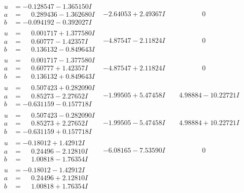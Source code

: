 \documentclass[1p]{elsarticle_modified}
\theoremstyle{definition}
\begin{document}
$$\begin{array}{c|c|c}
\begin{aligned}
u &= -0.128547 - 1.365150 I \\
a &= \phantom{-}0.289436 - 1.362680 I \\
b &= -0.094192 - 0.392027 I\end{aligned}
 & -2.64053 + 2.49367 I & \phantom{-0.000000 } 0 \\ \hline\begin{aligned}
u &= \phantom{-}0.001717 + 1.377580 I \\
a &= \phantom{-}0.60777 - 1.42357 I \\
b &= \phantom{-}0.136132 - 0.849643 I\end{aligned}
 & -4.87547 - 2.11824 I & \phantom{-0.000000 } 0 \\ \hline\begin{aligned}
u &= \phantom{-}0.001717 - 1.377580 I \\
a &= \phantom{-}0.60777 + 1.42357 I \\
b &= \phantom{-}0.136132 + 0.849643 I\end{aligned}
 & -4.87547 + 2.11824 I & \phantom{-0.000000 } 0 \\ \hline\begin{aligned}
u &= \phantom{-}0.507423 + 0.282090 I \\
a &= \phantom{-}0.85273 - 2.27652 I \\
b &= -0.631159 - 0.157718 I\end{aligned}
 & -1.99505 + 5.47458 I & \phantom{-}4.98884 - 10.22721 I \\ \hline\begin{aligned}
u &= \phantom{-}0.507423 - 0.282090 I \\
a &= \phantom{-}0.85273 + 2.27652 I \\
b &= -0.631159 + 0.157718 I\end{aligned}
 & -1.99505 - 5.47458 I & \phantom{-}4.98884 + 10.22721 I \\ \hline\begin{aligned}
u &= -0.18012 + 1.42912 I \\
a &= \phantom{-}0.24496 - 2.12810 I \\
b &= \phantom{-}1.00818 - 1.76354 I\end{aligned}
 & -6.08165 - 7.53590 I & \phantom{-0.000000 } 0 \\ \hline\begin{aligned}
u &= -0.18012 - 1.42912 I \\
a &= \phantom{-}0.24496 + 2.12810 I \\
b &= \phantom{-}1.00818 + 1.76354 I\end{aligned}

\end{array}$$
\end{document}
